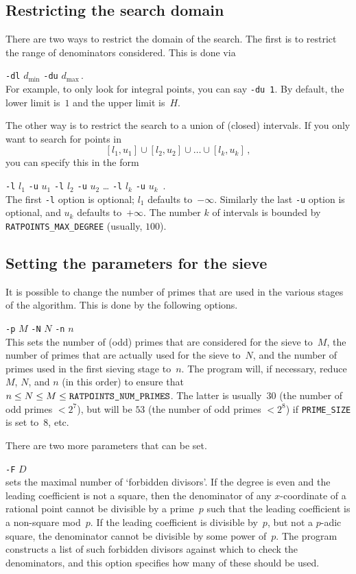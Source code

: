 \documentclass[12pt,a4paper,oneside]{amsart}
\begin{document}
\subsection{Restricting the search domain}

There are two ways to restrict the domain of the search. The first is
to restrict the range of denominators considered. This is done via \\
\strut\quad\verb+-dl+ $d_{\text{min}}$ \verb+-du+ $d_{\text{max}}$\,. \\
For example, to only look for integral points, you can say \verb+-du 1+.
By default, the lower limit is~$1$ and the upper limit is~$H$.

The other way is to restrict the search to a union of (closed) intervals.
If you only want to search for points in
\[ [l_1, u_1] \cup [l_2, u_2] \cup \dots \cup [l_k, u_k] \,, \]
you can specify this in the form \\
\strut\quad\verb+-l+ $l_1$ \verb+-u+ $u_1$ \verb+-l+ $l_2$ \verb+-u+ $u_2$ \dots
\verb+-l+ $l_k$ \verb+-u+ $u_k$ \,. \\
The first \verb+-l+ option is optional; $l_1$ defaults to~$-\infty$.
Similarly the last \verb+-u+ option is optional, and $u_k$ defaults
to~$+\infty$. The number $k$ of intervals is bounded by
\texttt{RATPOINTS\_MAX\_DEGREE} (usually, $100$).

\subsection{Setting the parameters for the sieve} \label{fd}

It is possible to change the number of primes that are used in the various
stages of the algorithm. This is done by the following options. \\
\strut\quad\verb+-p+ $M$ \verb+-N+ $N$ \verb+-n+ $n$ \\
This sets the number of (odd) primes that are considered for the sieve
to~$M$, the number of primes that are actually used for the sieve to~$N$,
and the number of primes used in the first sieving stage to~$n$. The program
will, if necessary, reduce $M$, $N$, and $n$ (in this order) to ensure
that $n \le N \le M \le \text{\texttt{RATPOINTS\_NUM\_PRIMES}}$. The latter
is usually~$30$ (the number of odd primes $< 2^7$), but will be $53$
(the number of odd primes $< 2^8$) if \texttt{PRIME\_SIZE} is set to~$8$, etc.

There are two more parameters that can be set. \\
\strut\quad\verb+-F+ $D$ \\
sets the maximal number of `forbidden divisors'. If the degree is even
and the leading coefficient is not a square, then the denominator of
any $x$-coordinate of a rational point cannot be divisible by a prime~$p$
such that the leading coefficient is a non-square mod~$p$. If the leading
coefficient is divisible by~$p$, but not a $p$-adic square, the denominator
cannot be divisible by some power of~$p$. The program constructs a list
of such forbidden divisors against which to check the denominators, and this
option specifies how many of these should be used.
\end{document}
